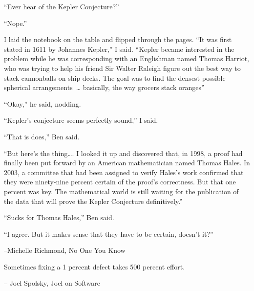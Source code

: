 {

\narrower\parindent=0pt
\baselineskip

{\it

``Ever hear of the Kepler Conjecture?''

``Nope.''

I laid the notebook on the table and flipped through the pages. ``It was first stated
in 1611 by Johannes Kepler,'' I said.  ``Kepler became interested in the problem while
he was corresponding with an Englishman named Thomas Harriot, who was trying
to help his friend Sir Walter Raleigh figure out the best way to stack cannonballs on ship
decks.  The goal was to find the densest possible spherical arrangements~\dots{}  basically,
the way grocers stack oranges''

``Okay,'' he said, nodding.

``Kepler's conjecture {\rm{seems}} perfectly sound,'' I said.

``That is does,'' Ben said.

``But here's the thing\dots.   I looked it up and discovered that, in 1998, a proof
had finally been put forward by an American mathematician named Thomas Hales.  In 2003,
a committee that had been assigned to verify Hales's work confirmed that they were ninety-nine
percent certain of the proof's correctness.  But that one percent was key.  The mathematical
world is still waiting for the publication of the data that will prove the Kepler Conjecture definitively.''

``Sucks for Thomas Hales,'' Ben said.

``I agree.  But it makes sense that they have to be certain, doesn't it?''


{\hfill--Michelle Richmond, No One You Know} %

}

}


\bigskip

{

\narrower\parindent=0pt
\baselineskip

{\it

Sometimes fixing a 1 percent defect takes 500 percent effort.

{\hfill-- Joel Spolsky, Joel on Software} %

}

}

\bigskip

